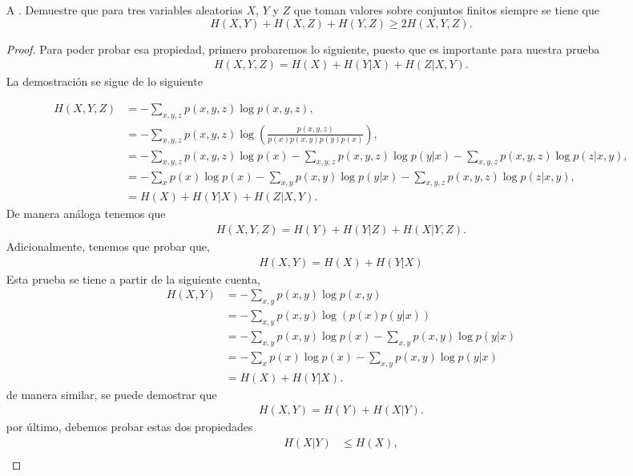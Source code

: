 \begin{enumerate}
    \item[A]. Demuestre que para tres variables aleatorias $X$, $Y$ y $Z$ que toman valores sobre conjuntos finitos siempre se tiene que 
    \[
    H(X, Y) + H(X, Z) + H(Y, Z) \geq 2H(X, Y, Z).
    \]
    \begin{proof}
    Para poder probar esa propiedad, primero probaremos lo siguiente, puesto que es importante para nuestra prueba
    \begin{align}
        H(X,Y,Z)=H(X)+H(Y|X)+H(Z|X,Y)
    .\end{align}
La demostración se sigue de lo siguiente

\begin{align*}
    H(X,Y,Z) &= - \sum_{x,y,z} p(x,y,z) \log p(x,y,z),\\
&= - \sum_{x,y,z} p(x,y,z) \log \left( \frac{p(x,y,z)}{p(x) p(x,y) p(y) p(x)} \right),\\
&= - \sum_{x,y,z} p(x,y,z) \log p(x)  - \sum_{x,y,z} p(x,y,z) \log p(y|x)- \sum_{x,y,z} p(x,y,z) \log p(z|x,y),\\
&= - \sum_{x} p(x) \log p(x) - \sum_{x,y} p(x,y) \log p(y|x) - \sum_{x,y,z} p(x,y,z) \log p(z|x,y),\\
&= H(X)+ H(Y|X)+ H(Z|X,Y).
\end{align*}
De manera análoga tenemos que 
 \begin{align}
        H(X,Y,Z)=H(Y)+H(Y|Z)+H(X|Y,Z)
    .\end{align}
Adicionalmente, tenemos que probar que,
\begin{align}
    H(X,Y)=H(X)+H(Y|X)
\end{align}
Esta prueba se tiene a partir de la siguiente cuenta,
\begin{align*}
    H(X,Y) &= - \sum_{x,y} p(x,y) \log p(x,y) \\
&= - \sum_{x,y} p(x,y) \log \left( p(x) p(y|x) \right)\\ 
&= - \sum_{x,y} p(x,y) \log p(x) - \sum_{x,y} p(x,y) \log p(y|x) \\
&= - \sum_{x} p(x) \log p(x) - \sum_{x,y} p(x,y) \log p(y|x)\\ 
&= H(X) + H(Y|X)
.\end{align*}
de manera similar, se puede demostrar que 
\begin{align}
    H(X,Y)=H(Y)+H(X|Y)
.\end{align}
por último, debemos probar estas dos propiedades
\begin{align}
    H(X|Y)&\leq H(X),\\

\end{align}
\end{proof}
\end{enumerate}
